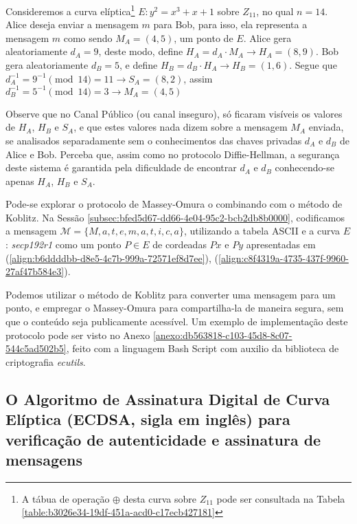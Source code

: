 \begin{exemplo} \label{exemplo:86309a61-4522-43c3-a20e-98b25d8cd250}
	Consideremos  a curva elíptica\footnote{A tábua de operação  $\oplus$ desta curva sobre $Z_{11}$ pode ser consultada na Tabela \ref{table:b3026e34-19df-451a-acd0-c17ecb427181}}  $E: y^2 = x^3 + x + 1$ sobre $Z_{11}$, no qual $n = 14$. Alice deseja enviar a mensagem $m$
	para Bob, para isso, ela representa a mensagem $m$ como sendo $M_A = (4, 5)$, um ponto de $E$. Alice gera aleatoriamente $d_A = 9$,
	deste modo, define $H_A = d_A \cdot M_A \rightarrow H_A = (8, 9)$. Bob gera aleatoriamente $d_B = 5$, e
	define $H_B = d_B \cdot H_A \rightarrow H_B = (1, 6)$. Segue que $d^{-1}_A  = 9^{-1} \pmod{14} = 11 \rightarrow  S_A =  (8, 2)$,
	assim $d^{-1}_B = 5^{-1} \pmod{14} = 3 \rightarrow  M_A = (4, 5)$

	\vspace*{-0.4cm}
\end{exemplo}

Observe que no Canal Público (ou canal inseguro), só ficaram visíveis os
valores de $H_A$, $H_B$ e $S_A$, e que estes valores nada dizem sobre a
mensagem $M_A$ enviada, se analisados separadamente sem o conhecimentos das
chaves privadas $d_A$ e $d_B$ de Alice e Bob. Perceba que, assim como no
protocolo Diffie-Hellman, a segurança deste sistema é garantida pela
dificuldade de encontrar $d_A$ e $d_B$ conhecendo-se apenas $H_A$, $H_B$ e
$S_A$.

Pode-se explorar o protocolo de Massey-Omura o combinando com o método de
Koblitz. Na Sessão \ref{subsec:bfed5d67-dd66-4e04-95c2-bcb2db8b0000},
codificamos a mensagem $\mathcal{M} = \{M, a, t, e, m, a, t, i, c, a\}$,
utilizando a tabela ASCII e a curva $E$: \textit{secp192r1} como um ponto $P
	\in E$ de cordeadas $Px$ e $Py$ apresentadas em
(\ref{align:b6ddddbb-d8e5-4c7b-999a-72571ef8d7ee}),
(\ref{align:c8f4319a-4735-437f-9960-27af47b584e3}).

Podemos utilizar o método de Koblitz para converter uma mensagem para um ponto,
e empregar o Massey-Omura para compartilha-la de maneira segura, sem que o
conteúdo seja publicamente acessível. Um exemplo de implementação deste
protocolo pode ser visto no Anexo
\ref{anexo:db563818-c103-45d8-8c07-544c5ad502b5}, feito com a linguagem Bash
Script com auxilio da biblioteca de criptografia \textit{ecutils}.

\subsection{O Algoritmo de Assinatura Digital de Curva Elíptica (ECDSA, sigla em inglês) para verificação de autenticidade e assinatura de mensagens} \label{subsec:b4aadc07-4c61-49e7-a656-b014d13f6639}


